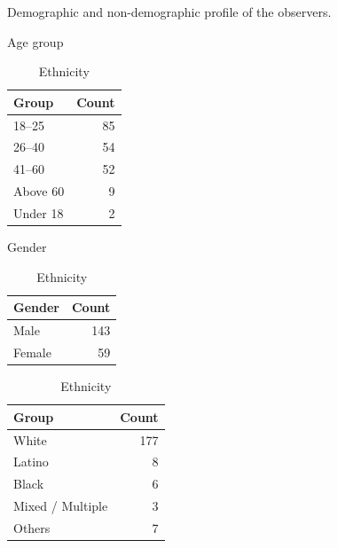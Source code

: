 \begin{table}
    \centering
    \caption{Demographic and non-demographic profile of the observers.}
    \label{tab:demographics}

    \begin{subtable}{0.3\textwidth}
        \centering
        \caption{Age group}
        \begin{tabular}{lr}
            \hline
            Group & Count \\
            \hline
            18--25 & 85 \\
            26--40 & 54 \\
            41--60 & 52 \\
            Above 60 & 9 \\
            Under 18 & 2 \\
            \hline
        \end{tabular}
    \end{subtable}
    \hfill
    \begin{subtable}{0.3\textwidth}
        \centering
        \caption{Gender}
        \begin{tabular}{lr}
            \hline
            Gender & Count \\
            \hline
            Male & 143 \\
            Female & 59 \\
            \hline
        \end{tabular}
    \end{subtable}
    \hfill
    \begin{subtable}{0.3\textwidth}
        \centering
        \caption{Ethnicity}
        \begin{tabular}{lr}
            \hline
            Group & Count \\
            \hline
            White & 177 \\
            Latino & 8 \\
            Black & 6 \\
            Mixed / Multiple & 3 \\
            Others & 7 \\
            \hline
        \end{tabular}
    \end{subtable}

    \vfill


\end{table}
